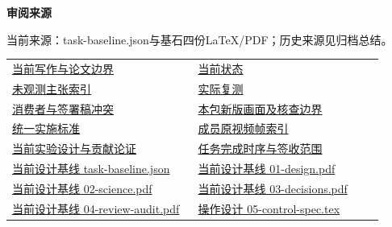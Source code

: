 \documentclass[11pt,a4paper]{article}
\newcommand{\reviewsubsection}[1]{\par\Needspace{4\baselineskip}\vspace{4pt}\begin{center}{\titlelatin\titlecjk\bfseries\fontsize{12}{18}\selectfont #1}\end{center}}
\begin{document}
\begin{minipage}{\linewidth}
\reviewsubsection{3.4 审阅来源}
当前来源：task-\allowbreak{}baseline.json与基石四份LaTeX/\allowbreak{}PDF；历史来源见归档总结。


\begingroup\small\setlength{\tabcolsep}{4pt}\begin{tabular}{@{}p{0.48\linewidth}p{0.48\linewidth}@{}}
\href{file:///D:/Agent/srp/agent/tasks/W-02/outputs/current-manuscript.md}{当前写作与论文边界} & \href{file:///D:/Agent/srp/agent/tasks/W-02/outputs/current-manuscript.json}{当前状态}\\[4pt]
\href{file:///D:/Agent/srp/agent/tasks/W-02/outputs/claim-evidence.json}{未观测主张索引} & \href{file:///D:/Agent/srp/agent/tasks/W-02/evidence/verification.json}{实际复测}\\[4pt]
\href{file:///D:/Agent/srp/agent/tasks/W-02/evidence/consumer-impact.md}{消费者与签署稿冲突} & \href{file:///D:/Agent/srp/agent/tasks/W-02/outputs/current-implementation-evidence.md}{本包新版画面及核查边界}\\[4pt]
\href{file:///D:/Agent/srp/agent/design/weather/2026-10-08_Storm\%E4\%B8\%8E\%E7\%BA\%AF\%E7\%B2\%92\%E5\%AD\%90\%E5\%8F\%8C\%E7\%8E\%AF\%E5\%AE\%9E\%E6\%96\%BD\%E6\%A0\%87\%E5\%87\%86.md}{统一实施标准} & \href{file:///D:/Agent/srp/human/assets/previews/2026-10-08/member-storm-particle-rings/frame-index.json}{成员原视频帧索引}\\[4pt]
\href{file:///D:/Agent/srp/agent/design/\%E5\%8E\%9F\%E5\%88\%9B\%E6\%80\%A7\%E4\%B8\%8E\%E8\%B4\%A1\%E7\%8C\%AE\%E8\%AE\%BA\%E8\%AF\%81_\%E5\%BD\%93\%E5\%89\%8D.md}{当前实验设计与贡献论证} & \href{file:///D:/Agent/srp/agent/work/2026-10-08_\%E4\%BB\%BB\%E5\%8A\%A1\%E5\%AE\%8C\%E6\%88\%90\%E6\%97\%B6\%E5\%BA\%8F\%E4\%B8\%8E\%E7\%A0\%94\%E7\%A9\%B6\%E4\%B8\%BB\%E6\%97\%A8.md}{任务完成时序与签收范围}\\[4pt]
\href{file:///D:/Agent/srp/agent/design/design-foundation-20261008/task-baseline.json}{当前设计基线 task-\allowbreak{}baseline.json} & \href{file:///D:/Agent/srp/agent/design/design-foundation-20261008/01-design.pdf}{当前设计基线 01-\allowbreak{}design.pdf}\\[4pt]
\href{file:///D:/Agent/srp/agent/design/design-foundation-20261008/02-science.pdf}{当前设计基线 02-\allowbreak{}science.pdf} & \href{file:///D:/Agent/srp/agent/design/design-foundation-20261008/03-decisions.pdf}{当前设计基线 03-\allowbreak{}decisions.pdf}\\[4pt]
\href{file:///D:/Agent/srp/agent/design/design-foundation-20261008/04-review-audit.pdf}{当前设计基线 04-\allowbreak{}review-\allowbreak{}audit.pdf} & \href{file:///D:/Agent/srp/agent/design/design-foundation-20261008/05-control-spec.tex}{操作设计 05-\allowbreak{}control-\allowbreak{}spec.tex}\\[4pt]

\end{tabular}
\end{minipage}
\end{document}
